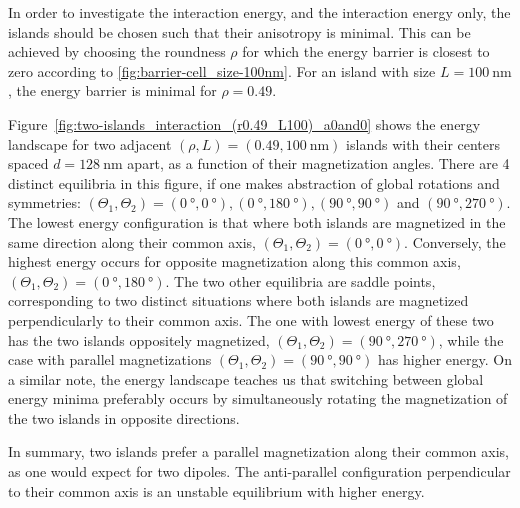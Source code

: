 \documentclass[11pt,a4paper,english,twoside]{article}
\begin{document}
In order to investigate the interaction energy, and the interaction energy only, the islands should be chosen such that their anisotropy is minimal. This can be achieved by choosing the roundness $\rho$ for which the energy barrier is closest to zero according to \cref{fig:barrier-cell_size-100nm}. For an island with size $L=\SI{100}{\nano\metre}$, the energy barrier is minimal for $\rho=0.49$. \par
Figure~\ref{fig:two-islands_interaction_(r0.49_L100)_a0and0} shows the energy landscape for two adjacent $(\rho, L)=(0.49, \SI{100}{\nano\metre})$ islands with their centers spaced $d=\SI{128}{\nano\metre}$ apart, as a function of their magnetization angles. There are 4 distinct equilibria in this figure, if one makes abstraction of global rotations and symmetries: $(\Theta_1, \Theta_2) = (\SI{0}{\degree},\SI{0}{\degree}), (\SI{0}{\degree}, \SI{180}{\degree}), (\SI{90}{\degree}, \SI{90}{\degree})$ and $(\SI{90}{\degree}, \SI{270}{\degree})$. The lowest energy configuration is that where both islands are magnetized in the same direction along their common axis, $(\Theta_1, \Theta_2) = (\SI{0}{\degree},\SI{0}{\degree})$. Conversely, the highest energy occurs for opposite magnetization along this common axis, $(\Theta_1, \Theta_2) = (\SI{0}{\degree},\SI{180}{\degree})$. The two other equilibria are saddle points, corresponding to two distinct situations where both islands are magnetized perpendicularly to their common axis. The one with lowest energy of these two has the two islands oppositely magnetized, $(\Theta_1, \Theta_2) = (\SI{90}{\degree}, \SI{270}{\degree})$, while the case with parallel magnetizations $(\Theta_1, \Theta_2) = (\SI{90}{\degree}, \SI{90}{\degree})$ has higher energy. On a similar note, the energy landscape teaches us that switching between global energy minima preferably occurs by simultaneously rotating the magnetization of the two islands in opposite directions. \par
In summary, two islands prefer a parallel magnetization along their common axis, as one would expect for two dipoles. The anti-parallel configuration perpendicular to their common axis is an unstable equilibrium with higher energy.
\end{document}
